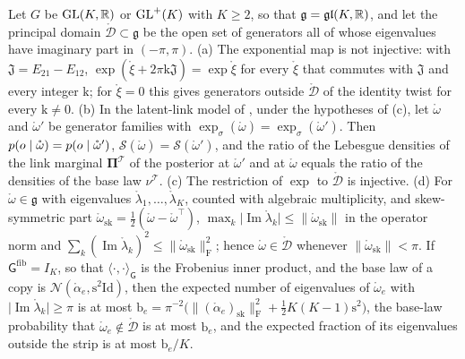 Let $G$ be $\mathrm{GL}(K,\mathbb R)$ or $\mathrm{GL}^+(K)$ with $K\geq2$, so that $\mathfrak g=\mathfrak{gl}(K,\mathbb R)$, and let the
principal domain $\mathring{\mathcal D}\subset\mathfrak g$ be the open set of generators all of whose
eigenvalues have imaginary part in $(-\pi,\pi)$.
(a) The exponential map is not injective: with $\mathfrak J=E_{21}-E_{12}$,
$\exp(\mathring\xi+2\pi\mathrm k\mathfrak J)=\exp\mathring\xi$ for every $\mathring\xi$ that commutes with
$\mathfrak J$ and every integer $\mathrm k$; for $\mathring\xi=0$ this gives generators outside
$\mathring{\mathcal D}$ of the identity twist for every $\mathrm k\neq0$.
(b) In the latent-link model of , under the hypotheses of
(c), let $\mathring\omega$ and $\mathring\omega'$ be generator families
with $\exp_\sigma(\mathring\omega)=\exp_\sigma(\mathring\omega')$. Then
$p(o\mid\mathring\omega)=p(o\mid\mathring\omega')$, $\mathscr S(\mathring\omega)=\mathscr S(\mathring\omega')$,
and the ratio of the Lebesgue densities of the link marginal $\boldsymbol\Pi^{\mathscr T}$ of the posterior
at $\mathring\omega'$ and at $\mathring\omega$ equals the ratio of the densities of the base law
$\nu^{\mathscr T}$.
(c) The restriction of $\exp$ to $\mathring{\mathcal D}$ is injective.
(d) For $\mathring\omega\in\mathfrak g$ with eigenvalues $\mathring\lambda_1,\ldots,\mathring\lambda_K$,
counted with algebraic multiplicity, and skew-symmetric part
$\mathring\omega_{\mathrm{sk}}=\frac12(\mathring\omega-\mathring\omega^\top)$,
$\max_k\lvert\operatorname{Im}\mathring\lambda_k\rvert\leq\lVert\mathring\omega_{\mathrm{sk}}\rVert$ in the operator
norm and $\sum_k(\operatorname{Im}\mathring\lambda_k)^2\leq\lVert\mathring\omega_{\mathrm{sk}}\rVert_{\mathrm F}^2$;
hence $\mathring\omega\in\mathring{\mathcal D}$ whenever $\lVert\mathring\omega_{\mathrm{sk}}\rVert<\pi$. If
$\mathsf G^{\mathrm{fib}}=I_K$, so that $\langle\cdot,\cdot\rangle_{\mathsf G}$ is the Frobenius inner product,
and the base law of a copy is $\mathcal N(\mathring\alpha_e,\mathrm s^2\mathrm{Id})$, then the expected number of
eigenvalues of $\mathring\omega_e$ with $\lvert\operatorname{Im}\mathring\lambda_k\rvert\geq\pi$ is at most
$\mathrm b_e=\pi^{-2}\bigl(\lVert(\mathring\alpha_e)_{\mathrm{sk}}\rVert_{\mathrm F}^2+\tfrac12K(K-1)\mathrm s^2\bigr)$,
the base-law probability that $\mathring\omega_e\notin\mathring{\mathcal D}$ is at most $\mathrm b_e$, and the
expected fraction of its eigenvalues outside the strip is at most $\mathrm b_e/K$. 

